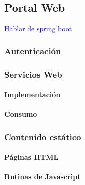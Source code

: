 \subsection{Portal Web}

\textcolor{blue}{Hablar de spring boot}

\subsubsection{Autenticación}

\subsubsection{Servicios Web}
\paragraph{Implementación\\}
\paragraph{Consumo\\}

\subsubsection{Contenido estático}
\paragraph{Páginas HTML}
\paragraph{Rutinas de Javascript}
